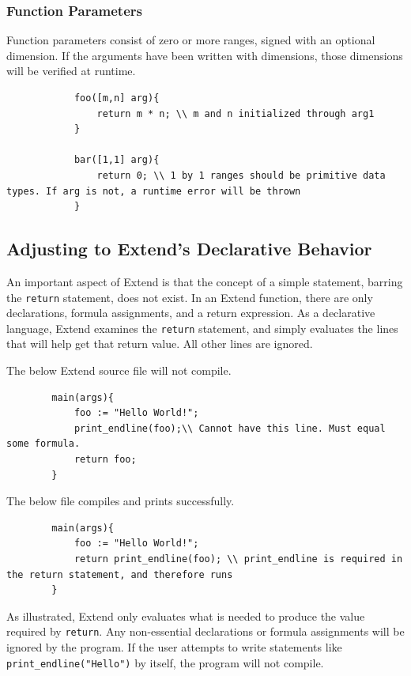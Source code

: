 		\subsubsection{Function Parameters}
		Function parameters consist of zero or more ranges, signed with an optional dimension. If the arguments have been written with dimensions, those dimensions will be verified at runtime.
		\begin{lstlisting}
			foo([m,n] arg){
				return m * n; \\ m and n initialized through arg1
			}

			bar([1,1] arg){
				return 0; \\ 1 by 1 ranges should be primitive data types. If arg is not, a runtime error will be thrown
			}
		\end{lstlisting}

	\subsection{Adjusting to Extend's Declarative Behavior}
	An important aspect of Extend is that the concept of a simple statement, barring the \texttt{return} statement, does not exist. In an Extend function, there are only declarations, formula assignments, and a return expression. As a declarative language, Extend examines the \texttt{return} statement, and simply evaluates the lines that will help get that return value. All other lines are ignored.

	\medskip \noindent The below Extend source file will not compile.

	\begin{lstlisting}
		main(args){
			foo := "Hello World!";
			print_endline(foo);\\ Cannot have this line. Must equal some formula.
			return foo;
		}
	\end{lstlisting}

	\medskip \noindent The below file compiles and prints successfully.

	\begin{lstlisting}
		main(args){
			foo := "Hello World!";
			return print_endline(foo); \\ print_endline is required in the return statement, and therefore runs
		}
	\end{lstlisting}

	\medskip \noindent As illustrated, Extend only evaluates what is needed to produce the value required by \texttt{return}. Any non-essential declarations or formula assignments will be ignored by the program. If the user attempts to write statements like \texttt{print\_endline("Hello")} by itself, the program will not compile.

